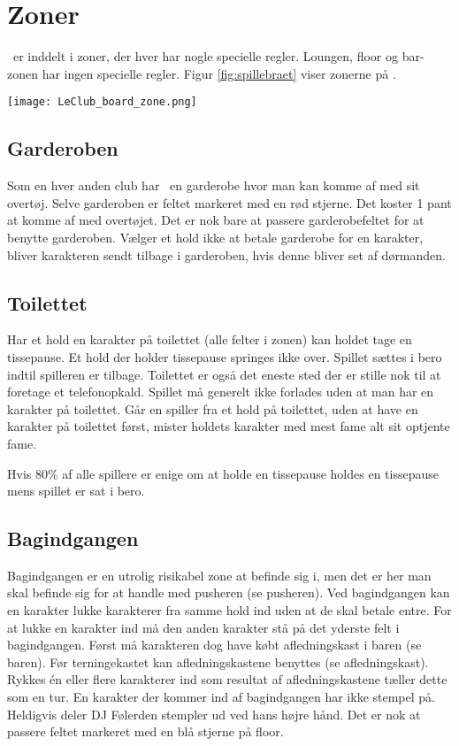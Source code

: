 \section{Zoner}
\LeClub\ er inddelt i zoner, der hver har nogle specielle regler. Loungen, floor og bar-zonen har ingen specielle regler. Figur \ref{fig:spillebraet} viser zonerne på \LeClub .

\begin{Figure}
\centering
\texttt{[image: LeClub\_board\_zone.png]}
\label{fig:spillebraet}
\end{Figure}

\subsection{Garderoben}
Som en hver anden club har \LeClub\ en garderobe hvor man kan komme af med sit overtøj. Selve garderoben er feltet markeret med en rød stjerne. Det koster 1 pant at komme af med overtøjet. Det er nok bare at passere garderobefeltet for at benytte garderoben. Vælger et hold ikke at betale garderobe for en karakter, bliver karakteren sendt tilbage i garderoben, hvis denne bliver set af dørmanden. 

\subsection{Toilettet}
Har et hold en karakter på toilettet (alle felter i zonen) kan holdet tage en tissepause. Et hold der holder tissepause springes ikke over. Spillet sættes i bero indtil spilleren er tilbage. Toilettet er også det eneste sted der er stille nok til at foretage et telefonopkald. Spillet må generelt ikke forlades uden at man har en karakter på toilettet. Går en spiller fra et hold på toilettet, uden at have en karakter på toilettet først, mister holdets karakter med mest fame alt sit optjente fame. 

Hvis 80\% af alle spillere er enige om at holde en tissepause holdes en tissepause mens spillet er sat i bero. 

\subsection{Bagindgangen}
Bagindgangen er en utrolig risikabel zone at befinde sig i, men det er her man skal befinde sig for at handle med pusheren (se pusheren).
Ved bagindgangen kan en karakter lukke karakterer fra samme hold ind uden at de skal betale entre. For at lukke en karakter ind må den anden karakter stå på det yderste felt i bagindgangen. Først må karakteren dog have købt afledningskast i baren (se baren). Før terningekastet kan afledningskastene benyttes (se afledningskast). Rykkes én eller flere karakterer ind som resultat af afledningskastene tæller dette som en tur. En karakter der kommer ind af bagindgangen har ikke stempel på. Heldigvis deler DJ Følerden stempler ud ved hans højre hånd. Det er nok at passere feltet markeret med en blå stjerne på floor. 

